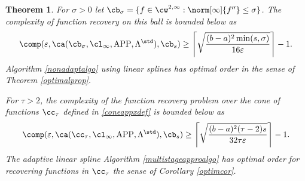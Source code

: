 \documentclass[]{elsarticle}
\DeclareMathOperator{\APP}{APP}
\newtheorem{theorem}{Theorem}
\theoremstyle{definition}
\theoremstyle{remark}
\begin{document}
\begin{theorem} \label{complowbdappr} For $\sigma>0$ let $\cb_{\sigma}=\{f \in \cw^{2,\infty} : \norm[\infty]{f''} \le \sigma\}$.  The complexity of function recovery on this ball is bounded below as
\begin{equation*}
\comp(\varepsilon,\ca(\cb_{\sigma},\cl_\infty,\APP,\Lambda^{\std}),\cb_{s}) \ge \left \lceil \sqrt{\frac{(b-a)^2\min(s,\sigma)}{16 \varepsilon}} \right \rceil -1 .
\end{equation*}
Algorithm \ref{nonadaptalgo} using linear splines has optimal order in the sense of Theorem \ref{optimalprop}.

For $\tau>2$, the complexity of the function recovery problem over the cone of functions $\cc_{\tau}$ defined in \eqref{coneappxdef} is bounded below as
\begin{equation*}
\comp(\varepsilon,\ca(\cc_{\tau},\cl_\infty,\APP,\Lambda^{\std}),\cb_{s}) \ge \left \lceil \sqrt{\frac{(b-a)^2(\tau-2)s}{32 \tau \varepsilon}} \right \rceil-1 .
\end{equation*}
The adaptive linear spline Algorithm \ref{multistageapproalgo} has optimal order for recovering functions in $\cc_{\tau}$ the sense of Corollary \ref{optimcor}.
\end{theorem}


%
\end{document}
